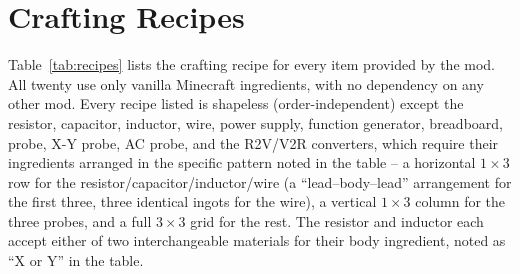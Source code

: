 \appendix
\section{Crafting Recipes}
\label{app:recipes}

Table~\ref{tab:recipes} lists the crafting recipe for every item provided by the mod. All
twenty use only vanilla Minecraft ingredients, with no dependency on any other mod. Every
recipe listed is shapeless (order-independent) except the resistor, capacitor, inductor, wire,
power supply, function generator, breadboard, probe, X-Y probe, AC probe, and the R2V/V2R
converters, which require their ingredients arranged in the specific pattern noted in the
table -- a horizontal $1\times3$ row for the resistor/capacitor/inductor/wire (a
``lead--body--lead'' arrangement for the first three, three identical ingots for the wire),
a vertical $1\times3$ column for the three probes, and a full $3\times3$ grid for the rest. The
resistor and inductor each accept either of two interchangeable materials for their body
ingredient, noted as ``X or Y'' in the table.

